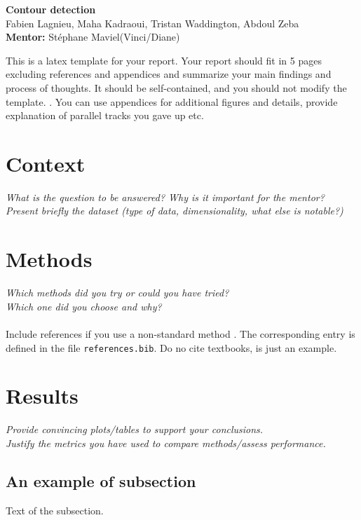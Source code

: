 \documentclass[11pt]{article}
\begin{document}
\begin{center}
\textbf{Contour detection} \\
Fabien Lagnieu, Maha Kadraoui, Tristan Waddington, Abdoul Zeba\\
\textbf{Mentor:} Stéphane Maviel(Vinci/Diane) \\\vspace{2em}
\textbf{\Large }
\end{center}
\vspace{-1cm}

This is a latex template for your report. Your report should fit in 5 pages  excluding references and appendices and summarize your main findings and process of thoughts. It should be self-contained, and you should not modify the template. . You can use appendices for additional figures and details, provide explanation of parallel tracks you gave up etc.

\section{Context}
\textit{What is the question to be answered? Why is it important for the mentor?\\
Present briefly the dataset (type of data, dimensionality, what else is notable?)}

\section{Methods}
\label{sec:methods}
\textit{Which methods did you try or could you have tried?\\
Which one did you choose and why?}\\\\
Include references if you use a non-standard method \cite{pml1Book}. The corresponding entry is defined in the file \texttt{references.bib}. Do no cite textbooks, \cite{pml1Book} is just an example. 

\section{Results}
\textit{Provide convincing plots/tables to support your conclusions.\\
Justify the metrics you have used to compare methods/assess performance.}

\subsection{An example of subsection}
Text of the subsection.
\end{document}
